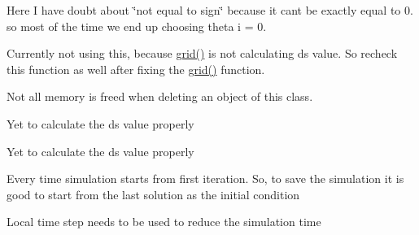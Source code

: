 \begin{DoxyRefList}
Here I have doubt about \char`\"{}not equal to sign\char`\"{} because it can\textquotesingle{}t be exactly equal to 0. so most of the time we end up choosing theta i = 0.  
\item[\label{bug__bug000004}%
\hypertarget{bug__bug000004}{}%
File \hyperlink{dt_8h}{dt.h} ]Currently not using this, because \hyperlink{grid__nozzle_8h_a6cdf5cf168063009e847db46d6624c1b}{grid()} is not calculating ds value. So recheck this function as well after fixing the \hyperlink{grid__nozzle_8h_a6cdf5cf168063009e847db46d6624c1b}{grid()} function.  
\item[\label{bug__bug000005}%
\hypertarget{bug__bug000005}{}%
File \hyperlink{eulerflux_8h}{eulerflux.h} ]Not all memory is freed when deleting an object of this class.  
\item[\label{bug__bug000006}%
\hypertarget{bug__bug000006}{}%
Member \hyperlink{TVD_8cpp_ac7609273a01eb63ff8a25ddf1aafeff7}{grid} (vector$<$ vector$<$ vector$<$ vector$<$ double $>$ $>$ $>$ $>$ \&i\+Face\+Area\+Vector, vector$<$ vector$<$ vector$<$ vector$<$ double $>$ $>$ $>$ $>$ \&j\+Face\+Area\+Vector, vector$<$ vector$<$ vector$<$ vector$<$ double $>$ $>$ $>$ $>$ \&k\+Face\+Area\+Vector, vector$<$ vector$<$ vector$<$ double $>$ $>$ $>$ \&Cell\+Volume, vector$<$ vector$<$ vector$<$ double $>$ $>$ $>$ \&delta\+\_\+s, int \&Ni, int \&Nj, int \&Nk)]Yet to calculate the ds value properly  
\item[\label{bug__bug000006}%
\hypertarget{bug__bug000006}{}%
Member \hyperlink{TVD_8cpp_ac7609273a01eb63ff8a25ddf1aafeff7}{grid} (vector$<$ vector$<$ vector$<$ vector$<$ double $>$ $>$ $>$ $>$ \&i\+Face\+Area\+Vector, vector$<$ vector$<$ vector$<$ vector$<$ double $>$ $>$ $>$ $>$ \&j\+Face\+Area\+Vector, vector$<$ vector$<$ vector$<$ vector$<$ double $>$ $>$ $>$ $>$ \&k\+Face\+Area\+Vector, vector$<$ vector$<$ vector$<$ double $>$ $>$ $>$ \&Cell\+Volume, vector$<$ vector$<$ vector$<$ double $>$ $>$ $>$ \&delta\+\_\+s, int \&Ni, int \&Nj, int \&Nk)]Yet to calculate the ds value properly  
\item[\label{bug__bug000009}%
\hypertarget{bug__bug000009}{}%
Member \hyperlink{TVD_8cpp_ae66f6b31b5ad750f1fe042a706a4e3d4}{main} ()]Every time simulation starts from first iteration. So, to save the simulation it is good to start from the last solution as the initial condition 

Local time step needs to be used to reduce the simulation time 
\end{DoxyRefList}